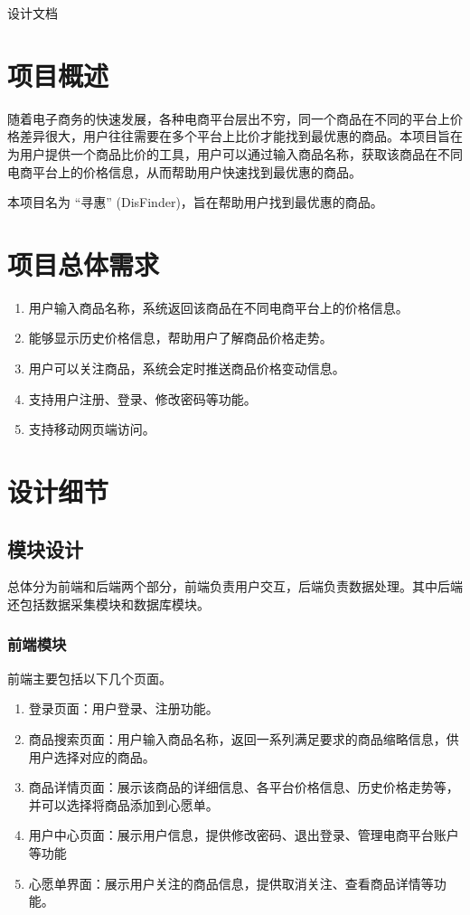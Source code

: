 设计文档
\chapter{项目概述}

随着电子商务的快速发展，各种电商平台层出不穷，同一个商品在不同的平台上价格差异很大，用户往往需要在多个平台上比价才能找到最优惠的商品。本项目旨在为用户提供一个商品比价的工具，用户可以通过输入商品名称，获取该商品在不同电商平台上的价格信息，从而帮助用户快速找到最优惠的商品。

本项目名为 “寻惠” (DisFinder)，旨在帮助用户找到最优惠的商品。

\chapter{项目总体需求}

\begin{enumerate}
  \item 用户输入商品名称，系统返回该商品在不同电商平台上的价格信息。
  \item 能够显示历史价格信息，帮助用户了解商品价格走势。
  \item 用户可以关注商品，系统会定时推送商品价格变动信息。
  \item 支持用户注册、登录、修改密码等功能。
  \item 支持移动网页端访问。
\end{enumerate}

\chapter{设计细节}

\section{模块设计}

总体分为前端和后端两个部分，前端负责用户交互，后端负责数据处理。其中后端还包括数据采集模块和数据库模块。

\subsection{前端模块}

前端主要包括以下几个页面。

\begin{enumerate}
  \item 登录页面：用户登录、注册功能。
  \item 商品搜索页面：用户输入商品名称，返回一系列满足要求的商品缩略信息，供用户选择对应的商品。
  \item 商品详情页面：展示该商品的详细信息、各平台价格信息、历史价格走势等，并可以选择将商品添加到心愿单。
  \item 用户中心页面：展示用户信息，提供修改密码、退出登录、管理电商平台账户等功能
  \item 心愿单界面：展示用户关注的商品信息，提供取消关注、查看商品详情等功能。
\end{enumerate}

